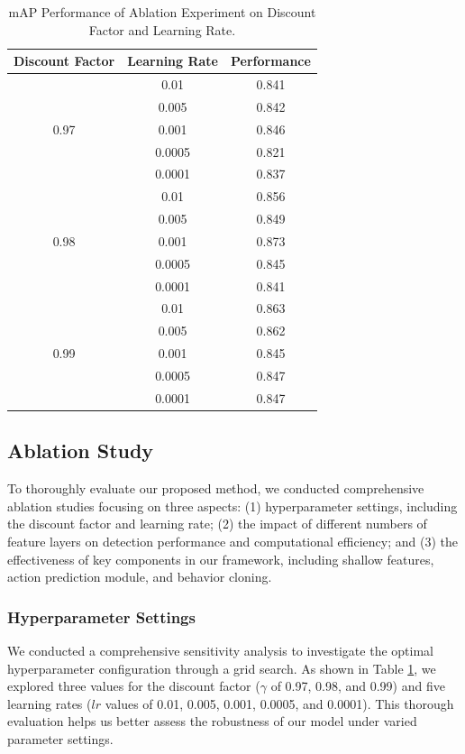 \documentclass[lettersize,journal]{IEEEtran}
\begin{document}
\begin{table}[!]
  \centering
  \caption{mAP Performance of Ablation Experiment on Discount Factor and Learning Rate.}
    {\begin{tabular}{ccc}
    \toprule[1.5pt]
    \multicolumn{1}{l}{Discount Factor} & \multicolumn{1}{l}{Learning Rate} & \multicolumn{1}{l}{Performance} \\ \hline
    \multirow{5}[0]{*}{0.97} & 0.01  & 0.841 \\
          & 0.005 & 0.842 \\
          & 0.001 & 0.846 \\
          & 0.0005 & 0.821 \\
          & 0.0001 & 0.837 \\ \hline
    \multirow{5}[0]{*}{0.98} & 0.01  & 0.856 \\
          & 0.005 & 0.849 \\
          & 0.001 & 0.873 \\
          & 0.0005 & 0.845 \\
          & 0.0001 & 0.841 \\ \hline
    \multirow{5}[0]{*}{0.99} & 0.01  & 0.863 \\
          & 0.005 & 0.862 \\
          & 0.001 & 0.845 \\
          & 0.0005 & 0.847 \\
          & 0.0001 & 0.847 \\ 
    \midrule[1.5pt]
    \end{tabular}%
}
  \label{hyperparameter}%
\end{table}%





\subsection{Ablation Study}

To thoroughly evaluate our proposed method, we conducted comprehensive ablation studies focusing on three aspects: (1) hyperparameter settings, including the discount factor and learning rate; (2) the impact of different numbers of feature layers on detection performance and computational efficiency; and (3) the effectiveness of key components in our framework, including shallow features, action prediction module, and behavior cloning.

\subsubsection{Hyperparameter Settings}
\label{Hyperparameter Settings}
We conducted a comprehensive sensitivity analysis to investigate the optimal hyperparameter configuration through a grid search. As shown in Table \ref{hyperparameter}, we explored three values for the discount factor ($\gamma$ of 0.97, 0.98, and 0.99) and five learning rates ($lr$ values of 0.01, 0.005, 0.001, 0.0005, and 0.0001). This thorough evaluation helps us better assess the robustness of our model under varied parameter settings.
\end{document}

